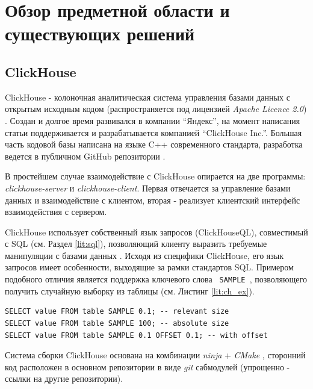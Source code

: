 \section{Обзор предметной области и существующих решений}
\subsection{ClickHouse} \label{lit:ch}
ClickHouse - колоночная аналитическая система управления базами данных с открытым исходным кодом (распространяется под лицензией \textit{Apache Licence 2.0}) \cite{ch_doc}. Создан и долгое время развивался в компании \enquote{Яндекс}, на момент написания статьи поддерживается и разрабатывается компанией \enquote{ClickHouse Inc.}. Большая часть кодовой базы написана на языке C++ современного стандарта, разработка ведется в публичном GitHub репозитории \cite{ch_repo}. 

В простейшем случае взаимодействие с ClickHouse опирается на две программы: \textit{clickhouse-server} и \textit{clickhouse-client}. Первая отвечается за управление базами данных и взаимодействие с клиентом, вторая - реализует клиентский интерфейс взаимодействия с сервером.

ClickHouse использует собственный язык запросов (ClickHouseQL), совместимый с SQL (см. Раздел \ref{lit:sql}), позволяющий клиенту выразить требуемые манипуляции с базами данных \cite{ch_sql_ref}. Исходя из специфики ClickHouse, его язык запросов имеет особенности, выходящие за рамки стандартов SQL. Примером подобного отличия является поддержка ключевого слова \texttt{ SAMPLE }, позволяющего получить случайную выборку из таблицы (см. Листинг \ref{lit:ch_ex}).

\begin{code}
    \label{lit:ch_ex}
    \begin{verbatim}
SELECT value FROM table SAMPLE 0.1; -- relevant size
SELECT value FROM table SAMPLE 100; -- absolute size
SELECT value FROM table SAMPLE 0.1 OFFSET 0.1; -- with offset
    \end{verbatim}
\end{code}

Система сборки ClickHouse основана на комбинации \textit{ninja} + \textit{CMake} \cite{ninja}\cite{cmake}, сторонний код расположен в основном репозитории в виде \textit{git} сабмодулей (упрощенно - ссылки на другие репозитории). 

